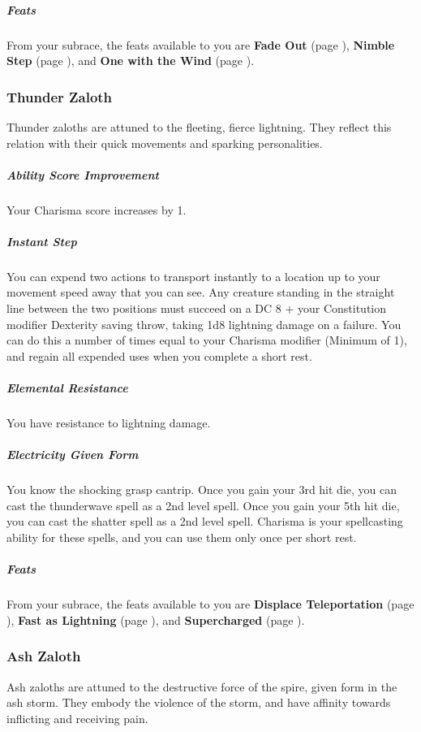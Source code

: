     \subparagraph{Feats} From your subrace, the feats available to you are
    \textbf{Fade Out} (page \pageref{feat::fadeout}),
    \textbf{Nimble Step} (page \pageref{feat::nimblestep}), and
    \textbf{One with the Wind} (page \pageref{feat::onewiththewind}).

\subsubsection{Thunder Zaloth}
    Thunder zaloths are attuned to the fleeting, fierce lightning.
    They reflect this relation with their quick movements and sparking personalities.

    \subparagraph{Ability Score Improvement} Your Charisma score increases by 1.

    \subparagraph{Instant Step} You can expend two actions to transport instantly to a location up to your movement speed away that you can see.
    Any creature standing in the straight line between the two positions must succeed on a DC 8 + your Constitution modifier Dexterity saving throw, taking 1d8 lightning damage on a failure.
    You can do this a number of times equal to your Charisma modifier (Minimum of 1), and regain all expended uses when you complete a short rest.

    \subparagraph{Elemental Resistance} You have resistance to lightning damage.

    \subparagraph{Electricity Given Form} You know the shocking grasp cantrip.
    Once you gain your 3rd hit die, you can cast the thunderwave spell as a 2nd level spell.
    Once you gain your 5th hit die, you can cast the shatter spell as a 2nd level spell.
    Charisma is your spellcasting ability for these spells, and you can use them only once per short rest.

    \subparagraph{Feats} From your subrace, the feats available to you are
    \textbf{Displace Teleportation} (page \pageref{feat::displaceteleportation}),
    \textbf{Fast as Lightning} (page \pageref{feat::fastaslightning}), and
    \textbf{Supercharged} (page \pageref{feat::supercharged}).

\subsubsection{Ash Zaloth}
    Ash zaloths are attuned to the destructive force of the spire, given form in the ash storm.
    They embody the violence of the storm, and have affinity towards inflicting and receiving pain.

